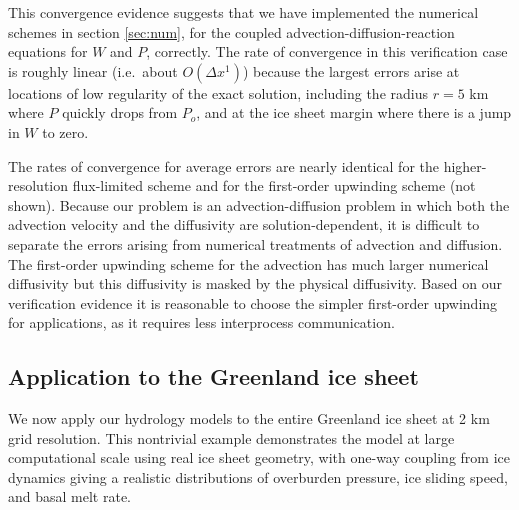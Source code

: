 \documentclass[gmd]{copernicus}   %
\begin{document}
This convergence evidence suggests that we have implemented the numerical schemes in section \ref{sec:num}, for the coupled advection-diffusion-reaction equations for $W$ and $P$, correctly.  The rate of convergence in this verification case is roughly linear (i.e.~about $O(\Delta x^1)$) because the largest errors arise at locations of low regularity of the exact solution, including the radius $r=5$ km where $P$ quickly drops from $P_o$, and at the ice sheet margin where there is a jump in $W$ to zero.

The rates of convergence for average errors are nearly identical for the higher-resolution flux-limited scheme and for the first-order upwinding scheme (not shown).  Because our problem is an advection-diffusion problem in which both the advection velocity and the diffusivity are solution-dependent, it is difficult to separate the errors arising from numerical treatments of advection and diffusion.  The first-order upwinding scheme for the advection has much larger numerical diffusivity but this diffusivity is masked by the physical diffusivity.  Based on our verification evidence it is reasonable to choose the simpler first-order upwinding for applications, as it requires less interprocess communication.


\subsection{Application to the Greenland ice sheet}

We now apply our hydrology models to the entire Greenland ice sheet at 2 km grid resolution.  This nontrivial example demonstrates the model at large computational scale using real ice sheet geometry, with one-way coupling from ice dynamics giving a realistic distributions of overburden pressure, ice sliding speed, and basal melt rate.
\end{document}
